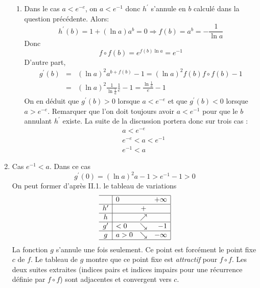 \begin{enumerate}
\begin{enumerate}
\item Dans le cas $a<e^{-e}$, on  $a<e^{-1}$ donc $h^\prime$ s'annule en $b$ calculé dans la question précédente. Alors:
\begin{displaymath}
 h^\prime(b)=1+(\ln a)a^b = 0 \Rightarrow f(b) = a^b =-\frac{1}{\ln a}
\end{displaymath}
Donc
\begin{displaymath}
 f\circ f (b)=e^{f(b)\ln a}=e^{-1}
\end{displaymath}
D'autre part, 
\begin{eqnarray*}
g^\prime(b)&=&(\ln a)^2a^{b+f(b)}-1=(\ln a)^2f(b)f\circ f(b)-1\\
&=&(\ln a)^2\frac{1}{\ln\frac{1}{a}}\frac{1}{e} -1 = \frac{\ln \frac{1}{a}}{e}-1
\end{eqnarray*}
On en déduit que $g^\prime(b)>0$ lorsque $a<e^{-e}$ et que $g^\prime(b)<0$ lorsque $a>e^{-e}$. Remarquer que l'on doit toujours avoir $a<e^{-1}$ pour que le $b$ annulant $h^\prime$ existe.\newline
La suite de la discussion portera donc sur trois cas : 
\begin{align*}
 & a <e^{-e} \\
 & e^{-e} < a < e^{-1} \\
 & e^{-1} < a
\end{align*}
\end{enumerate}

\item Cas $e^{-1}<a$. Dans ce cas 
\begin{displaymath}
g^\prime(0) = (\ln a)^2a-1 > e^{-1}-1 > 0 
\end{displaymath}
On peut former d'après II.1. le tableau de variations
\[
\begin{array}{c|lcr|}
\hline
& 0 & & +\infty \\
\hline
h^\prime & & + & \\
\hline
h & & \nearrow & \\
\hline
g^\prime & <0 & \searrow & -1 \\
\hline
g & a>0 & \searrow & -\infty \\
\hline
\end{array} 
\]
La fonction $g$ s'annule une fois seulement. Ce point est forcément le point fixe $c$ de $f$. Le tableau de $g$ montre que ce point fixe est \emph{attractif} pour $f\circ f$. Les deux suites extraites (indices pairs et indices impairs pour une récurrence définie par $f\circ f$) sont adjacentes et convergent vers $c$.


\end{enumerate}
